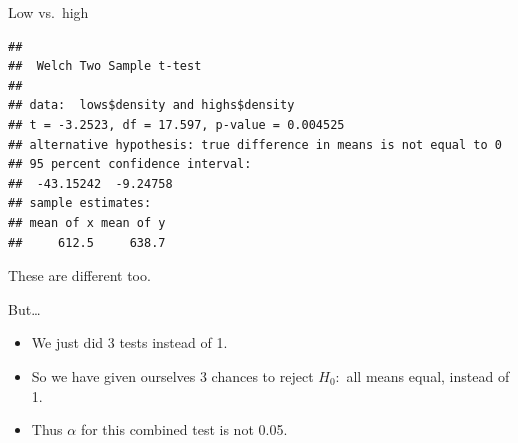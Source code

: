 \documentclass[ignorenonframetext,]{beamer}
\newenvironment{Shaded}{\begin{snugshade}}{\end{snugshade}}
\newcommand{\KeywordTok}[1]{\textcolor[rgb]{0.13,0.29,0.53}{\textbf{#1}}}
\newcommand{\NormalTok}[1]{#1}
\newcommand{\OperatorTok}[1]{\textcolor[rgb]{0.81,0.36,0.00}{\textbf{#1}}}
\providecommand{\tightlist}{%
  \setlength{\itemsep}{0pt}\setlength{\parskip}{0pt}}
\begin{document}
\begin{frame}[fragile]{Low vs.~high}
\protect\hypertarget{low-vs.high}{}

\begin{Shaded}
\end{Shaded}

\begin{verbatim}
## 
##  Welch Two Sample t-test
## 
## data:  lows$density and highs$density
## t = -3.2523, df = 17.597, p-value = 0.004525
## alternative hypothesis: true difference in means is not equal to 0
## 95 percent confidence interval:
##  -43.15242  -9.24758
## sample estimates:
## mean of x mean of y 
##     612.5     638.7
\end{verbatim}

These are different too.

\end{frame}

\begin{frame}{But\ldots{}}
\protect\hypertarget{but}{}

\begin{itemize}
\tightlist
\item
  We just did 3 tests instead of 1.
\item
  So we have given ourselves 3 chances to reject \(H_0:\) all means
  equal, instead of 1.
\item
  Thus \(\alpha\) for this combined test is not 0.05.
\end{itemize}

\end{frame}
\end{document}

